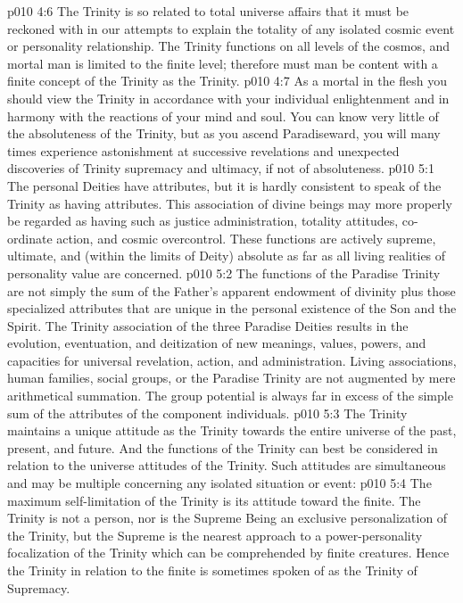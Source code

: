 \pc \vs p010 4:6 The Trinity is so related to total universe affairs that it must be reckoned with in our attempts to explain the totality of any isolated cosmic event or personality relationship. The Trinity functions on all levels of the cosmos, and mortal man is limited to the finite level; therefore must man be content with a finite concept of the Trinity as the Trinity.
\vs p010 4:7 As a mortal in the flesh you should view the Trinity in accordance with your individual enlightenment and in harmony with the reactions of your mind and soul. You can know very little of the absoluteness of the Trinity, but as you ascend Paradiseward, you will many times experience astonishment at successive revelations and unexpected discoveries of Trinity supremacy and ultimacy, if not of absoluteness.
\vs p010 5:1 The personal Deities have attributes, but it is hardly consistent to speak of the Trinity as having attributes. This association of divine beings may more properly be regarded as having  such as justice administration, totality attitudes, co\hyp{}ordinate action, and cosmic overcontrol. These functions are actively supreme, ultimate, and (within the limits of Deity) absolute as far as all living realities of personality value are concerned.
\vs p010 5:2 The functions of the Paradise Trinity are not simply the sum of the Father’s apparent endowment of divinity plus those specialized attributes that are unique in the personal existence of the Son and the Spirit. The Trinity association of the three Paradise Deities results in the evolution, eventuation, and deitization of new meanings, values, powers, and capacities for universal revelation, action, and administration. Living associations, human families, social groups, or the Paradise Trinity are not augmented by mere arithmetical summation. The group potential is always far in excess of the simple sum of the attributes of the component individuals.
\pc \vs p010 5:3 The Trinity maintains a unique attitude as the Trinity towards the entire universe of the past, present, and future. And the functions of the Trinity can best be considered in relation to the universe attitudes of the Trinity. Such attitudes are simultaneous and may be multiple concerning any isolated situation or event:
\pc \vs p010 5:4 \bibnobreakspace {} The maximum self\hyp{}limitation of the Trinity is its attitude toward the finite. The Trinity is not a person, nor is the Supreme Being an exclusive personalization of the Trinity, but the Supreme is the nearest approach to a power\hyp{}personality focalization of the Trinity which can be comprehended by finite creatures. Hence the Trinity in relation to the finite is sometimes spoken of as the Trinity of Supremacy.
